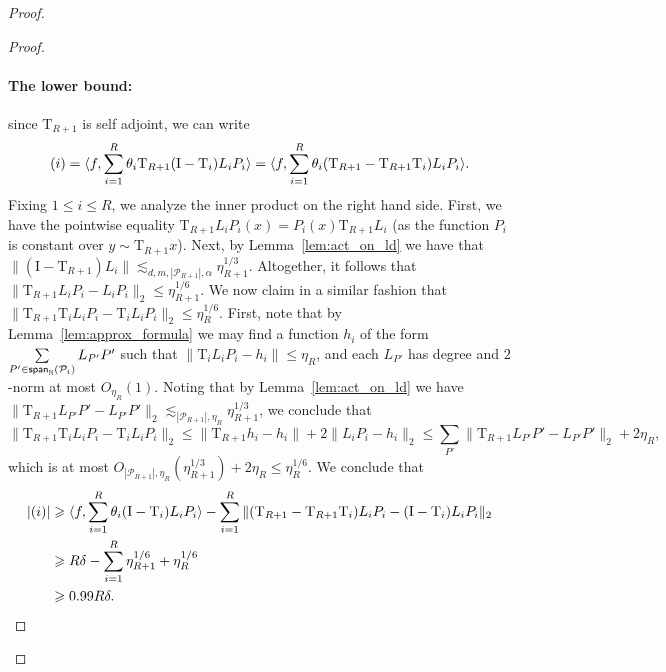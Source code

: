 \documentclass[10pt,a4paper]{amsart}
\newcommand\card[1]{\left| {#1} \right|}
\newcommand\norm[1]{\| #1 \|}
\renewcommand{\lll}{\lesssim}
\newcommand\spn{{\sf span}_{\mathbb{N}}}
\newcommand\inner[2]{\langle{#1},{#2}\rangle}
\renewcommand\geq{\geqslant}
\renewcommand\leq{\leqslant}
\newcommand{\rom}[1]{\uppercase\expandafter{\romannumeral #1\relax}}
\begin{document}
\begin{proof}
\begin{proof}
        \paragraph{The lower bound:} since $\mathrm{T}_{R+1}$ is self adjoint, we can write
        \[
        (\rom{1}) = \inner{f}{\sum\limits_{i=1}^{R}\theta_i \mathrm{T}_{R+1}(\mathrm{I}-\mathrm{T}_i)L_i P_i}
        =
        \inner{f}{\sum\limits_{i=1}^{R}\theta_i (\mathrm{T}_{R+1}-\mathrm{T}_{R+1}\mathrm{T}_i)L_i P_i}.
        \]
        Fixing $1\leq i\leq R$, we analyze the inner product on the right hand side. 
        First, we have the pointwise equality $\mathrm{T}_{R+1} L_i P_i(x) = P_i(x)\mathrm{T}_{R+1} L_i$ (as the function $P_i$ is constant over $y\sim \mathrm{T}_{R+1} x$). Next, by Lemma~\ref{lem:act_on_ld} we have that 
        $\norm{(\mathrm{I}-\mathrm{T}_{R+1})L_i}\lll_{d,m,\card{\mathcal{P}_{R+1}},\alpha} \eta_{R+1}^{1/3}$. Altogether, it follows that $\norm{\mathrm{T}_{R+1} L_i P_i - L_i P_i}_2\leq \eta_{R+1}^{1/6}$. 
        We now claim in a similar fashion that 
        $\norm{\mathrm{T}_{R+1}\mathrm{T}_iL_i P_i - \mathrm{T}_iL_i P_i}_2\leq \eta_{R}^{1/6}$. First, note that by Lemma~\ref{lem:approx_formula} we may find a function $h_i$ of the form $\sum\limits_{P'\in \spn(\mathcal{P}_i)}L_{P'}P'$ such that $\norm{\mathrm{T}_iL_i P_i-h_i}\leq \eta_R$, and each $L_{P'}$ has degree and $2$-norm at most $O_{\eta_R}(1)$. Noting that by Lemma~\ref{lem:act_on_ld} we have $\norm{\mathrm{T}_{R+1} L_{P'} P' - L_{P'} P'}_2\lll_{\card{\mathcal{P}_{R+1}},\eta_R} \eta_{R+1}^{1/3}$, we conclude that
        \[
    \norm{\mathrm{T}_{R+1}\mathrm{T}_iL_i P_i - \mathrm{T}_iL_i P_i}_2
    \leq
    \norm{\mathrm{T}_{R+1} h_i - h_i}
    +2\norm{L_iP_i - h_i}_2
    \leq 
    \sum\limits_{P'}\norm{\mathrm{T}_{R+1} L_{P'}P' - L_{P'}P'}_2
    +2\eta_R,
        \]
        which is at most $O_{\card{\mathcal{P}_{R+1}},\eta_R}(\eta_{R+1}^{1/3}) + 2\eta_R\leq \eta_R^{1/6}$. 
        We conclude that 
        \begin{align*}
        \card{(\rom{1})}
        &\geq 
        \inner{f}{\sum\limits_{i=1}^{R}\theta_i (\mathrm{I}-\mathrm{T}_i)L_i P_i}
        -\sum\limits_{i=1}^{R}
        \norm{(\mathrm{T}_{R+1}-\mathrm{T}_{R+1}\mathrm{T}_i)L_i P_i-(\mathrm{I}-\mathrm{T}_i)L_i P_i}_2
        \\
        &\geq 
        R\delta - 
        \sum\limits_{i=1}^{R} \eta_{R+1}^{1/6} + \eta_{R}^{1/6}\\
        &\geq 0.99 R\delta.
        \end{align*}

\end{proof}
\end{proof}
\end{document}
